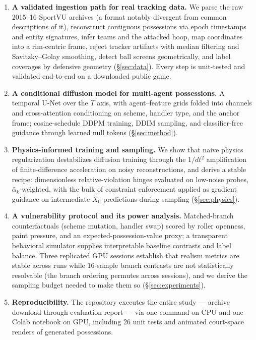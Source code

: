 \documentclass[11pt]{article}
\begin{document}
\begin{enumerate}[leftmargin=*,itemsep=2pt]
\item \textbf{A validated ingestion path for real tracking data.} We parse the
  raw 2015--16 SportVU archives (a format notably divergent from common
  descriptions of it), reconstruct contiguous possessions via epoch timestamps
  and entity signatures, infer teams and the attacked hoop, map coordinates
  into a rim-centric frame, reject tracker artifacts with median filtering and
  Savitzky--Golay smoothing, detect ball screens geometrically, and label
  coverages by defensive geometry (\S\ref{sec:data}). Every step is unit-tested
  and validated end-to-end on a downloaded public game.
\item \textbf{A conditional diffusion model for multi-agent possessions.} A
  temporal U-Net over the $T$ axis, with agent--feature grids folded into
  channels and cross-attention conditioning on scheme, handler type, and the
  anchor frame; cosine-schedule DDPM training, DDIM sampling, and
  classifier-free guidance through learned null tokens (\S\ref{sec:method}).
\item \textbf{Physics-informed training and sampling.} We show that naive
  physics regularization destabilizes diffusion training through the
  $1/dt^2$ amplification of finite-difference acceleration on noisy
  reconstructions, and derive a stable recipe: dimensionless relative-violation
  hinges evaluated on low-noise probes, $\bar\alpha_k$-weighted, with the bulk
  of constraint enforcement applied as gradient guidance on intermediate $X_0$
  predictions during sampling (\S\ref{sec:physics}).
\item \textbf{A vulnerability protocol and its power analysis.} Matched-branch
  counterfactuals (scheme mutation, handler swap) scored by roller openness,
  paint pressure, and an expected-possession-value proxy; a transparent
  behavioral simulator supplies interpretable baseline contrasts and label
  balance. Three replicated GPU sessions establish that realism metrics are
  stable across runs while 16-sample branch contrasts are not statistically
  resolvable (the branch ordering permutes across sessions), and we derive
  the sampling budget needed to make them so (\S\ref{sec:experiments}).
\item \textbf{Reproducibility.} The repository executes the entire study ---
  archive download through evaluation report --- via one command on CPU and
  one Colab notebook on GPU, including 26 unit tests and animated court-space
  renders of generated possessions.
\end{enumerate}
\end{document}

